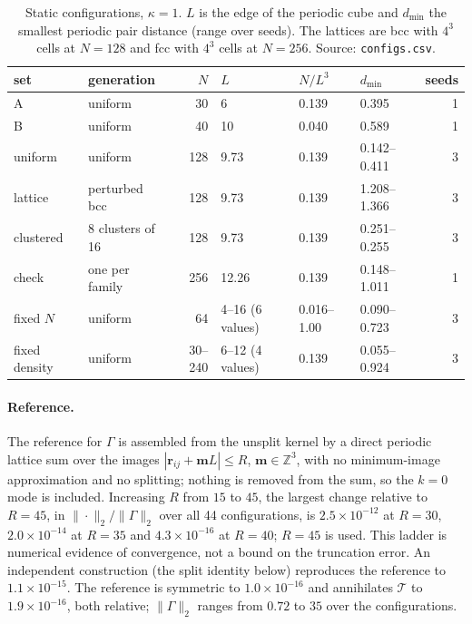 \documentclass[11pt]{article}
\theoremstyle{plain}
\newcommand{\rr}{\bm r}
\newcommand{\cT}{\mathcal{T}}
\DeclareRobustCommand{\_}{\textunderscore\allowbreak}
\begin{document}
\begin{table}[htbp]
\centering
\small
\begin{tabular}{llrlllr}
\toprule
set & generation & $N$ & $L$ & $N/L^3$ & $d_{\min}$ & seeds \\
\midrule
A & uniform & 30 & 6 & 0.139 & 0.395 & 1 \\
B & uniform & 40 & 10 & 0.040 & 0.589 & 1 \\
uniform & uniform & 128 & 9.73 & 0.139 & 0.142--0.411 & 3 \\
lattice & perturbed bcc & 128 & 9.73 & 0.139 & 1.208--1.366 & 3 \\
clustered & 8 clusters of 16 & 128 & 9.73 & 0.139 & 0.251--0.255 & 3 \\
check & one per family & 256 & 12.26 & 0.139 & 0.148--1.011 & 1 \\
fixed $N$ & uniform & 64 & 4--16 (6 values) & 0.016--1.00 & 0.090--0.723 & 3 \\
fixed density & uniform & 30--240 & 6--12 (4 values) & 0.139 & 0.055--0.924 & 3 \\
\bottomrule
\end{tabular}
\caption{Static configurations, $\kappa=1$. $L$ is the edge of the periodic cube and $d_{\min}$ the smallest periodic
pair distance (range over seeds). The lattices are bcc with $4^3$ cells at $N=128$ and fcc with $4^3$ cells at $N=256$.
Source: \texttt{configs.csv}.}
\label{tab:exp-configs}
\end{table}

\paragraph{Reference.}
The reference for $\Gamma$ is assembled from the unsplit kernel by a direct
periodic lattice sum over the images $|\rr_{ij}+\bm mL|\le R$,
$\bm m\in\mathbb Z^3$, with no minimum-image approximation and no splitting;
nothing is removed from the sum, so the $k=0$ mode is included. Increasing $R$
from $15$ to $45$, the largest change relative to $R=45$, in
$\|\cdot\|_2/\|\Gamma\|_2$ over all 44 configurations, is
$2.5\times10^{-12}$ at $R=30$, $2.0\times10^{-14}$ at $R=35$ and
$4.3\times10^{-16}$ at $R=40$; $R=45$ is used. This ladder is numerical
evidence of convergence, not a bound on the truncation error. An independent
construction (the split identity below) reproduces the reference to
$1.1\times10^{-15}$. The reference is symmetric to $1.0\times10^{-16}$ and
annihilates $\cT$ to $1.9\times10^{-16}$, both relative; $\|\Gamma\|_2$ ranges
from $0.72$ to $35$ over the configurations.
\end{document}
